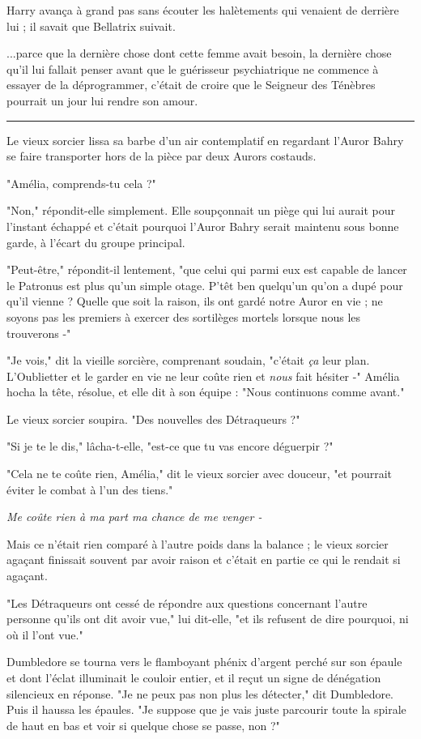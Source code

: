 Harry avança à grand pas sans écouter les halètements qui venaient de derrière lui ; il savait que Bellatrix suivait.

...parce que la dernière chose dont cette femme avait besoin, la dernière chose qu'il lui fallait penser avant que le guérisseur psychiatrique ne commence à essayer de la déprogrammer, c'était de croire que le Seigneur des Ténèbres pourrait un jour lui rendre son amour.
\par\noindent\rule{\textwidth}{0.4pt}
Le vieux sorcier lissa sa barbe d'un air contemplatif en regardant l'Auror Bahry se faire transporter hors de la pièce par deux Aurors costauds.

"Amélia, comprends-tu cela ?"

"Non," répondit-elle simplement. Elle soupçonnait un piège qui lui aurait pour l'instant échappé et c'était pourquoi l'Auror Bahry serait maintenu sous bonne garde, à l'écart du groupe principal.

"Peut-être," répondit-il lentement, "que celui qui parmi eux est capable de lancer le Patronus est plus qu'un simple otage. P'têt ben quelqu'un qu'on a dupé pour qu'il vienne ? Quelle que soit la raison, ils ont gardé notre Auror en vie ; ne soyons pas les premiers à exercer des sortilèges mortels lorsque nous les trouverons -"

"Je vois," dit la vieille sorcière, comprenant soudain, "c'était \emph{ça}  leur plan. L'Oublietter et le garder en vie ne leur coûte rien et \emph{nous}  fait hésiter -" Amélia hocha la tête, résolue, et elle dit à son équipe : "Nous continuons comme avant."

Le vieux sorcier soupira. "Des nouvelles des Détraqueurs ?"

"Si je te le dis," lâcha-t-elle, "est-ce que tu vas encore déguerpir ?"

"Cela ne te coûte rien, Amélia," dit le vieux sorcier avec douceur, "et pourrait éviter le combat à l'un des tiens."

\emph{Me coûte rien à ma part ma chance de me venger -} 

Mais ce n'était rien comparé à l'autre poids dans la balance ; le vieux sorcier agaçant finissait souvent par avoir raison et c'était en partie ce qui le rendait si agaçant.

"Les Détraqueurs ont cessé de répondre aux questions concernant l'autre personne qu'ils ont dit avoir vue," lui dit-elle, "et ils refusent de dire pourquoi, ni où il l'ont vue."

Dumbledore se tourna vers le flamboyant phénix d'argent perché sur son épaule et dont l'éclat illuminait le couloir entier, et il reçut un signe de dénégation silencieux en réponse. "Je ne peux pas non plus les détecter," dit Dumbledore. Puis il haussa les épaules. "Je suppose que je vais juste parcourir toute la spirale de haut en bas et voir si quelque chose se passe, non ?"

